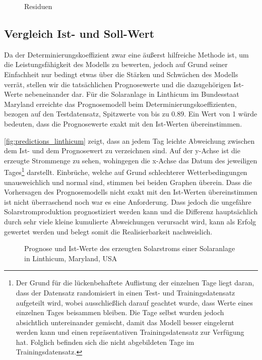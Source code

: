 \documentclass[12pt, a4paper]{article}
\begin{document}

\begin{figure}
\centering
\def\svgwidth{400pt}

\caption{Residuen }
\label{fig:residuals}
\end {figure}

\subsection{Vergleich Ist- und Soll-Wert}

Da der Determinierungskoeffizient zwar eine äußerst hilfreiche Methode ist, um die Leistungsfähigkeit des Modells zu bewerten, jedoch auf Grund seiner Einfachheit nur bedingt etwas über die Stärken und Schwächen des Modells verrät, stellen wir die tatsächlichen Prognosewerte und die dazugehörigen Ist-Werte nebeneinander dar. Für die Solaranlage in Linthicum im Bundesstaat Maryland erreichte das Prognosemodell beim Determinierungskoeffizienten, bezogen auf den Testdatensatz, Spitzwerte von bis zu 0.89. Ein Wert von 1 würde bedeuten, dass die Prognosewerte exakt mit den Ist-Werten übereinstimmen. 

\autoref{fig:predictions_linthicum} zeigt, dass an jedem Tag leichte Abweichung zwischen dem Ist- und dem Prognosewert zu verzeichnen sind. Auf der y-Achse ist die erzeugte Strommenge zu sehen, wohingegen die x-Achse das Datum des jeweiligen Tages\footnote{Der Grund für die lückenbehaftete Auflistung der einzelnen Tage liegt daran, dass der Datensatz randomisiert in einen Test- und Trainingsdatensatz aufgeteilt wird, wobei ausschließlich darauf geachtet wurde, dass Werte eines einzelnen Tages beisammen bleiben. Die Tage selbst wurden jedoch absichtlich untereinander gemischt, damit das Modell besser eingelernt werden kann und einen repräsentativen Trainingsdatensatz zur Verfügung hat. Folglich befinden sich die nicht abgebildeten Tage im Trainingsdatensatz.} darstellt. Einbrüche, welche auf Grund schlechterer Wetterbedingungen unausweichlich und normal sind, stimmen bei beiden Graphen überein. Dass die Vorhersagen des Prognosemodells nicht exakt mit den Ist-Werten übereinstimmen ist nicht überraschend noch war es eine Anforderung. Dass jedoch die ungefähre Solarstromproduktion prognostiziert werden kann und die Differenz hauptsächlich durch sehr viele kleine kumulierte Abweichungen verursacht wird, kann als Erfolg gewertet werden und belegt somit die Realisierbarkeit nachweislich.


\begin{figure}[H]
\centering
\def\svgwidth{400pt}

\caption{Prognose und Ist-Werte des erzeugten Solarstroms einer Solaranlage in Linthicum, Maryland, USA}
\label{fig:predictions_linthicum}
\end {figure}
\end{document}
